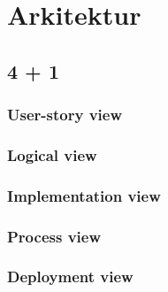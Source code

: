 \chapter{Arkitektur}


\lipsum[2]

\section{4 + 1}

\subsection{User-story view}

\subsection{Logical view}

\subsection{Implementation view} %

\subsection{Process view}

\subsection{Deployment view} %

